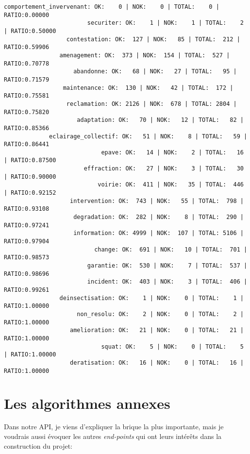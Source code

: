 \begin{lstlisting}
comportement_invervenant: OK:    0 | NOK:    0 | TOTAL:    0 | RATIO:0.00000
                        securiter: OK:    1 | NOK:    1 | TOTAL:    2 | RATIO:0.50000
                  contestation: OK:  127 | NOK:   85 | TOTAL:  212 | RATIO:0.59906
                amenagement: OK:  373 | NOK:  154 | TOTAL:  527 | RATIO:0.70778
                    abandonne: OK:   68 | NOK:   27 | TOTAL:   95 | RATIO:0.71579
                 maintenance: OK:  130 | NOK:   42 | TOTAL:  172 | RATIO:0.75581
                  reclamation: OK: 2126 | NOK:  678 | TOTAL: 2804 | RATIO:0.75820
                     adaptation: OK:   70 | NOK:   12 | TOTAL:   82 | RATIO:0.85366
             eclairage_collectif: OK:   51 | NOK:    8 | TOTAL:   59 | RATIO:0.86441
                            epave: OK:   14 | NOK:    2 | TOTAL:   16 | RATIO:0.87500
                       effraction: OK:   27 | NOK:    3 | TOTAL:   30 | RATIO:0.90000
                           voirie: OK:  411 | NOK:   35 | TOTAL:  446 | RATIO:0.92152
                   intervention: OK:  743 | NOK:   55 | TOTAL:  798 | RATIO:0.93108
                    degradation: OK:  282 | NOK:    8 | TOTAL:  290 | RATIO:0.97241
                    information: OK: 4999 | NOK:  107 | TOTAL: 5106 | RATIO:0.97904
                          change: OK:  691 | NOK:   10 | TOTAL:  701 | RATIO:0.98573
                        garantie: OK:  530 | NOK:    7 | TOTAL:  537 | RATIO:0.98696
                        incident: OK:  403 | NOK:    3 | TOTAL:  406 | RATIO:0.99261
                deinsectisation: OK:    1 | NOK:    0 | TOTAL:    1 | RATIO:1.00000
                     non_resolu: OK:    2 | NOK:    0 | TOTAL:    2 | RATIO:1.00000
                   amelioration: OK:   21 | NOK:    0 | TOTAL:   21 | RATIO:1.00000
                            squat: OK:    5 | NOK:    0 | TOTAL:    5 | RATIO:1.00000
                   deratisation: OK:   16 | NOK:    0 | TOTAL:   16 | RATIO:1.00000
\end{lstlisting}
\pagebreak

\section{Les algorithmes annexes}

Dans notre API, je viens d'expliquer la brique la plus importante, mais je voudrais aussi évoquer les autres \textit{end-points} qui ont leurs intérêts dans la construction du projet:

